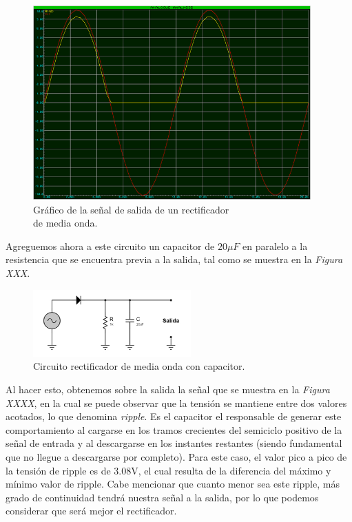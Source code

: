 \documentclass{article}
\begin{document}
\newpage
\begin{figure}[h]
	\centering
	\includegraphics[width=0.95\textwidth]{images/4-4-2-grafico-circuito-rectificador-media-onda.jpg}
	\caption{Gráfico de la señal de salida de un rectificador\\ de media onda.}
\end{figure}
\bigskip\bigskip

	
	Agreguemos ahora a este circuito un capacitor de $20\mu F$ en paralelo a la resistencia que se encuentra previa a la salida, tal como se muestra en la \textit{Figura XXX}.
\bigskip


\begin{figure}[h]
	\centering
	\includegraphics[width=0.54\textwidth]{images/4-4-3-circuito-rectificador-media-onda-con-filtro.jpg}
	\medskip
	\caption{Circuito rectificador de media onda con capacitor.}
\end{figure}
\bigskip\bigskip


	Al hacer esto, obtenemos sobre la salida la señal que se muestra en la \textit{Figura XXXX}, en la cual se puede observar que la tensión se mantiene entre dos valores acotados, lo que denomina \textit{ripple}. Es el capacitor el responsable de generar este comportamiento al cargarse en los tramos crecientes del semiciclo positivo de la señal de entrada y al descargarse en los instantes restantes (siendo fundamental que no llegue a descargarse por completo). Para este caso, el valor pico a pico de la tensión de ripple es de 3.08V, el cual resulta de la diferencia del máximo y mínimo valor de ripple. Cabe mencionar que cuanto menor sea este ripple, más grado de continuidad tendrá nuestra señal a la salida, por lo que podemos considerar que será mejor el rectificador.
\bigskip
\end{document}
